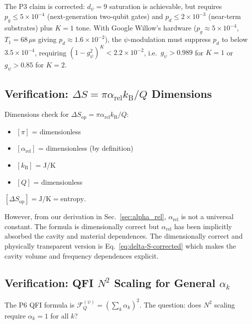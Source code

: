 \documentclass[11pt]{article}
\theoremstyle{definition}
\theoremstyle{remark}
\newcommand{\kB}{k_{\mathrm{B}}}
\begin{document}
The P3 claim is corrected: $d_\psi = 9$ saturation is achievable, but
requires $p_g \leq 5\times 10^{-4}$ (next-generation two-qubit gates) and
$p_d \leq 2\times 10^{-3}$ (near-term substrates) plus $K = 1$ tone.
With Google Willow's hardware ($p_g \approx 5\times 10^{-4}$, $T_1 = 68\,\mu$s
giving $p_d \approx 1.6\times 10^{-2}$), the $\psi$-modulation must suppress
$p_d$ to below $3.5\times 10^{-4}$, requiring $(1 - g_\psi^2)^K < 2.2\times
10^{-2}$, i.e.\ $g_\psi > 0.989$ for $K = 1$ or $g_\psi > 0.85$ for $K = 2$.

\subsection{Verification: $\Delta S = \pi\alpha_{\mathrm{rel}}\kB/Q$ Dimensions}
\label{sec:verify-deltaS}

Dimensions check for $\Delta S_{\mathrm{op}} = \pi\alpha_{\mathrm{rel}}\kB/Q$:
\begin{itemize}
\item $[\pi]$ = dimensionless
\item $[\alpha_{\mathrm{rel}}]$ = dimensionless (by definition)
\item $[\kB]$ = J/K
\item $[Q]$ = dimensionless
\end{itemize}
$[\Delta S_{\mathrm{op}}] = \mathrm{J/K} = \mathrm{entropy}$. \checkmark

However, from our derivation in Sec.~\ref{sec:alpha_rel}, $\alpha_{\mathrm{rel}}$
is not a universal constant. The formula is dimensionally correct but
$\alpha_{\mathrm{rel}}$ has been implicitly absorbed the cavity and material
dependences. The dimensionally correct and physically transparent version is
Eq.~\eqref{eq:delta-S-corrected} which makes the cavity volume and frequency
dependences explicit.

\subsection{Verification: QFI $N^2$ Scaling for General $\alpha_k$}
\label{sec:alpha-k-general}

The P6 QFI formula is $\mathcal{F}_Q^{(\psi)} = (\sum_k \alpha_k)^2$.
The question: does $N^2$ scaling require $\alpha_k = 1$ for all $k$?
\end{document}
